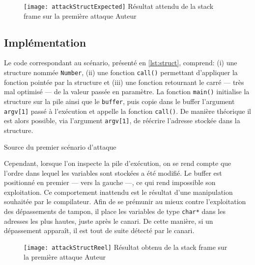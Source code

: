 \begin{figure}[H]
	\centering
	\texttt{[image: attackStructExpected]}
	{Résultat attendu de la \og stack frame \fg sur la première attaque}
	{Auteur}
	\label{fig:attackStructExpected}
\end{figure}

\subsection{Implémentation}

Le code correspondant au scénario, présenté en \autoref{lst:struct}, comprend: (i) une structure nommée \texttt{Number}, (ii) une fonction \texttt{call()} permettant d'appliquer la fonction pointée par la structure et (iii) une fonction retournant le carré --- très mal optimisé --- de la valeur passée en paramètre. La fonction \texttt{main()} initialise la structure sur la pile ainsi que le \texttt{buffer}, puis copie dans le buffer l'argument \texttt{argv[1]} passé à l'exécution et appelle la fonction \texttt{call()}. De manière théorique il est alors possible, via l'argument \texttt{argv[1]}, de réécrire l'adresse stockée dans la structure.

\begin{listing}
	\caption{Source du premier scénario d'attaque}
	\label{lst:struct}
\end{listing}

Cependant, lorsque l'on inspecte la pile d'exécution, on se rend compte que l'ordre dans lequel les variables sont stockées a été modifié. Le \og buffer \fg est positionné en premier --- vers la gauche ---, ce qui rend impossible son exploitation. Ce comportement inattendu est le résultat d'une manipulation souhaitée par le compilateur. Afin de se prémunir au mieux contre l'exploitation des dépassements de tampon, il place les variables de type \texttt{char*} dans les adresses les plus hautes, juste après le canari. De cette manière, si un dépassement apparaît, il est tout de suite détecté par le canari.

\begin{figure}[H]
	\centering
	\texttt{[image: attackStructReel]}
	{Résultat obtenu de la \og stack frame \fg sur la première attaque}
	{Auteur}
	\label{fig:attackStructReel}
\end{figure}

